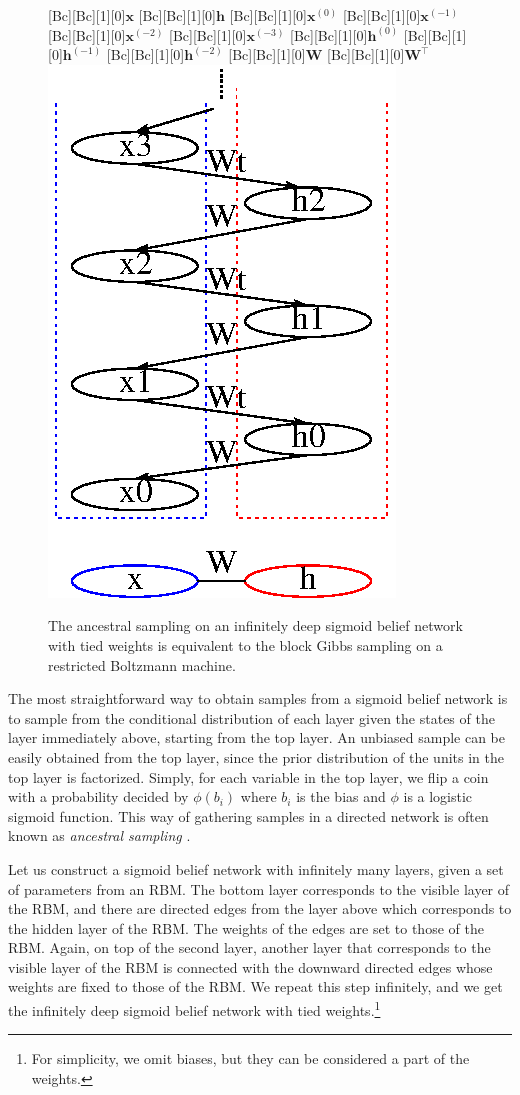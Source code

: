 \documentclass{now}
\newcommand{\vect}[1]{\mathbf{#1}}
\newcommand{\matr}[1]{\mathbf{#1}}
\newcommand{\vh}[0]{\vect{h}}
\newcommand{\vx}[0]{\vect{x}}
\newcommand{\mW}[0]{\matr{W}}
\begin{document}
\begin{figure}
    \centering
    [Bc][Bc][1][0]{$\vx$}
    [Bc][Bc][1][0]{$\vh$}
    [Bc][Bc][1][0]{$\vx^{(0)}$}
    [Bc][Bc][1][0]{$\vx^{(-1)}$}
    [Bc][Bc][1][0]{$\vx^{(-2)}$}
    [Bc][Bc][1][0]{$\vx^{(-3)}$}
    [Bc][Bc][1][0]{$\vh^{(0)}$}
    [Bc][Bc][1][0]{$\vh^{(-1)}$}
    [Bc][Bc][1][0]{$\vh^{(-2)}$}
    [Bc][Bc][1][0]{$\mW$}
    [Bc][Bc][1][0]{$\mW^\top$}
    \includegraphics[width=0.4\columnwidth]{../figures/rbm_dbn.eps}
    \caption{The ancestral sampling on an infinitely deep
    sigmoid belief network with tied weights is equivalent
    to the block Gibbs sampling on a restricted Boltzmann
    machine.}
    \label{fig:inf_sbn}
\end{figure}

The most straightforward way to obtain samples from a
sigmoid belief network is to sample from the conditional
distribution of each layer given the states of the layer
immediately above, starting from the top layer. An unbiased
sample can be easily obtained from the top layer, since the
prior distribution of the units in the top layer is
factorized. Simply, for each variable in the top layer, we
flip a coin with a probability decided by $\phi(b_i)$
where $b_i$ is the bias and $\phi$ is a logistic sigmoid
function. This way of gathering samples in a directed
network is often known as \textit{ancestral sampling}
\citep[see, e.g.,][]{Bishop2006,Murphy2012}.

Let us construct a sigmoid belief network with infinitely
many layers, given a set of parameters from an RBM. The bottom
layer corresponds to the visible layer of the RBM, and there
are directed edges from the layer above which corresponds to
the hidden layer of the RBM. The weights of the edges are
set to those of the RBM. Again, on top of the second layer,
another layer that corresponds to the visible layer of the
RBM is connected with the downward directed edges whose
weights are fixed to those of the RBM. We repeat this step
infinitely, and we get the infinitely deep sigmoid belief
network with tied weights.\footnote{For simplicity, we
omit biases, but they can be considered a part of the
weights.}
\end{document}

